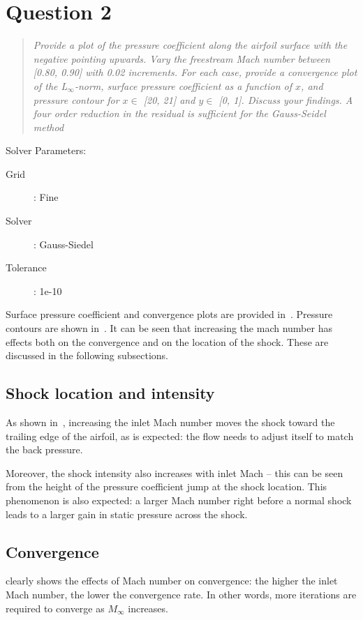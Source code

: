 \documentclass{SelimArticle}
\begin{document}
\newpage
\section{Question 2}
\begin{quote}
    \textit{ Provide a plot of the pressure coefficient along the airfoil surface with the negative
    pointing upwards. Vary the freestream Mach number between [0.80, 0.90] with 0.02
increments. For each case, provide a convergence plot of the L$_\infty$-norm, surface pressure
coefficient as a function of $x$, and pressure contour for $x \in$ [20, 21] and $y \in $ [0, 1].
Discuss your findings. A four order reduction in the residual is sufficient for the Gauss-Seidel
method}
\end{quote}
Solver Parameters:
\begin{description}
    \item[Grid]: Fine
    \item[Solver]: Gauss-Siedel
    \item[Tolerance]: 1e-10
\end{description}

Surface pressure coefficient and convergence plots are provided in~.
Pressure contours are shown in~. It can be seen that increasing the
mach number has effects both on the convergence and on the location of the shock. These
are discussed in the following subsections.

\subsection{Shock location and intensity}
As shown in~, increasing the inlet Mach number moves the shock
toward the trailing edge of the airfoil, as is expected: the flow needs to adjust
itself to match the back pressure.

Moreover, the shock intensity also increases with inlet Mach -- this can be seen from
the height of the pressure coefficient jump at the shock location. This phenomenon is also
expected: a larger Mach number right before a normal shock leads to a larger gain in
static pressure across the shock.

\subsection{Convergence}
 clearly shows the effects of Mach number on convergence: the higher
the inlet Mach number, the lower the convergence rate. In other words, more iterations
are required to converge as $M_{\infty}$ increases.
\end{document}
